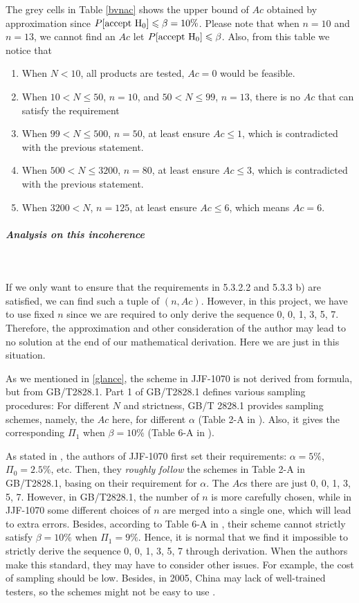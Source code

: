 \documentclass[conf]{new-aiaa}
\begin{document}
The grey cells in Table \ref{bvnac} shows the upper bound of $Ac$ obtained by approximation since $P[{\rm accept\ H_0}] \leqslant \beta = 10\%$. Please note that when $n = 10$ and $n = 13$, we cannot find an $Ac$ let $P[{\rm accept\ H_0}] \leqslant \beta$. Also, from this table we notice that \medskip

\begin{enumerate}
    \item When $N < 10$, all products are tested, $Ac = 0$ would be feasible.
    \item When $10 < N \leqslant 50$, $n = 10$, and $50 < N \leqslant 99$, $n = 13$, there is no $Ac$ that can satisfy the requirement
    \item When $99 < N \leqslant 500$, $n = 50$, at least ensure $Ac \leqslant 1$, which is contradicted with the previous statement.
    \item When $500 < N \leqslant 3200$, $n = 80$, at least ensure $Ac \leqslant 3$, which is contradicted with the previous statement.
    \item When $3200 < N $, $n = 125$, at least ensure $Ac \leqslant 6$, which means $Ac = 6$.
\end{enumerate}

\subparagraph{Analysis on this incoherence}\label{detail}\ \medskip

If we only want to ensure that the requirements in 5.3.2.2 and 5.3.3 b) are satisfied, we can find such a tuple of $(n, Ac)$. However, in this project, we have to use fixed $n$ since we are required to only  derive the sequence 0, 0, 1, 3, 5, 7. Therefore, the approximation and other consideration of the author may lead to no solution at the end of our mathematical derivation. Here we are just in this situation. \medskip

As we mentioned in \ref{glance}, the scheme in JJF-1070 is not derived from formula, but from GB/T2828.1. Part 1 of GB/T2828.1 defines various sampling procedures: For different $N$ and strictness, GB/T 2828.1 provides sampling schemes, namely, the $Ac$ here, for different $\alpha$ (Table 2-A in \cite{GBT}). Also, it gives the corresponding $\Pi_1$ when $\beta = 10\%$ (Table 6-A in \cite{GBT}). \medskip

As stated in \cite{jf4}, the authors of JJF-1070 first set their requirements: $\alpha = 5\%$, $\Pi_0 = 2.5\%$, etc. Then, they \emph{roughly follow} the schemes in Table 2-A in GB/T2828.1, basing on their requirement for $\alpha$. The $Ac$s there are just 0, 0, 1, 3, 5, 7. However, in GB/T2828.1, the number of $n$ is more carefully chosen, while in JJF-1070 some different choices of $n$ are merged into a single one, which will lead to extra errors. Besides, according to Table 6-A in \cite{GBT}, their scheme cannot strictly satisfy $\beta = 10\%$ when $\Pi_1 = 9\%$. Hence, it is normal that we find it impossible to strictly derive the sequence 0, 0, 1, 3, 5, 7 through derivation. When the authors make this standard, they may have to consider other issues. For example, the cost of sampling should be low. Besides, in 2005, China may lack of well-trained testers, so the schemes might not be easy to use \cite{szw}. \medskip
\end{document}
